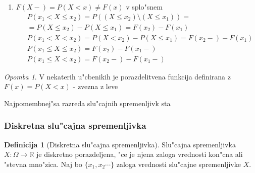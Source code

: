 \documentclass[a4paper,12pt]{article}
\theoremstyle{definition}
\newtheorem{defn}[counter]{Definicija}
\theoremstyle{remark}
\newtheorem*{rem}{Opomba}
\newcommand{\R}{\mathbb{R}}
\begin{document}
\begin{enumerate}
\begin{proof}
            \begin{align*}
                &\{(X \leq x_n)\} = \cap_{n=1}^{\infty} \{\omega \in \Omega: X(\omega) \leq x_n\} = \\
                &= \{\omega \in \Omega: X(\omega) \leq x\} = (X \leq x): \\
                &\qquad (\supseteq): \text{ o"citno} \\
                &\qquad (\subseteq): \omega \in \Omega \implies \text{za vsak n izpolnjeno} \implies    
                    \lim \text{ obstaja}
            \end{align*}

            \begin{align*}
                &F(x+) = \lim_{n \to \infty} F(x_n) = \lim_{n \to \infty} P(X \leq x_n) = \\
                &= P(\cap_{n=1}^{\infty} (X \leq x_n)) = P(X \leq x) = F(x)
            \end{align*}
        \end{proof}
    \item $F(X-) = P(X < x) \neq F(x)$ v splo"snem
        \begin{align*}
            &P(x_1 < X \leq x_2) = P((X \leq x_2) \text{\textbackslash} (X \leq x_1)) = \\
            &= P(X \leq x_2) - P(X \leq x_1) = F(x_2) - F(x_1) \\
            &P(x_1 < X < x_2) = P(X < x_2) - P(X \leq x_1) = F(x_2-) - F(x_1) \\
            &P(x_1 \leq X \leq x_2) = F(x_2) - F(x_1-) \\
            &P(x_1 \leq X < x_2) = F(x_2-) - F(x_1-)
        \end{align*}
\end{enumerate}

\begin{rem}
    V nekaterih u"cbenikih je porazdelitvena funkcija definirana z $F(x) = P(X < x)$ - zvezna z leve
\end{rem}

Najpomembnej"sa razreda slu"cajnih spremenljivk sta

\subsubsection{Diskretna slu"cajna spremenljivka}

\begin{defn}[Diskretna slu"cajna spremenljivka]
    Slu"cajna spremenljivka $X: \Omega \to \R$ je diskretno porazdeljena, "ce je njena zaloga vrednosti kon"cna ali
    "stevna mno"zica. Naj bo $\{x_1, x_2 \cdots\}$ zaloga vrednosti slu"cajne spremenljivke $X$.
\end{defn}
\end{document}
